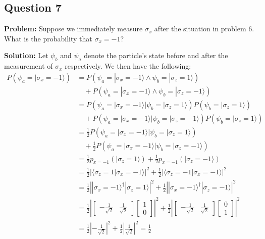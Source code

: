 \documentclass{article}
\begin{document}
\subsection*{Question 7}
\noindent\textbf{Problem:} Suppose we immediately measure $\sigma_x$ after the situation in problem 6. What is the probability that $\sigma_x=-1$?
\bigskip

\noindent\textbf{Solution:} Let $\psi_b$ and $\psi_a$ denote the particle's state before and after the measurement of $\sigma_x$ respectively. We then have the following:
\begin{align*}
    P(\psi_a=|\sigma_x=-1\rangle)&=P(\psi_a=|\sigma_x=-1\rangle\wedge\psi_b=|\sigma_z=1\rangle)\\&\quad+P(\psi_a=|\sigma_x=-1\rangle\wedge\psi_b=|\sigma_z=-1\rangle)\tag{law of total prob.}\\
    &=P(\psi_a=|\sigma_x=-1\rangle|\psi_b=|\sigma_z=1\rangle)P(\psi_b=|\sigma_z=1\rangle)\\
    &\quad+P(\psi_a=|\sigma_x=-1\rangle|\psi_b=|\sigma_z=-1\rangle)P(\psi_b=|\sigma_z=1\rangle)\tag{chain rule}\\
    &=\frac{1}{2}P(\psi_a=|\sigma_x=-1\rangle|\psi_b=|\sigma_z=1\rangle)\\
    &\quad+\frac{1}{2}P(\psi_a=|\sigma_x=-1\rangle|\psi_b=|\sigma_z=-1\rangle)\tag{problem 6}\\
    &=\frac{1}{2}p_{x=-1}(|\sigma_z=1\rangle)+\frac{1}{2}p_{x=-1}(|\sigma_z=-1\rangle)\\
    &=\frac{1}{2}\left|\langle\sigma_z=1|\sigma_x=-1\rangle\right|^2+\frac{1}{2}\left|\langle\sigma_z=-1|\sigma_x=-1\rangle\right|^2\\
    &=\frac{1}{2}\left||\sigma_x=-1\rangle^\dagger|\sigma_z=1\rangle\right|^2+\frac{1}{2}\left||\sigma_x=-1\rangle^\dagger|\sigma_z=-1\rangle\right|^2\\
    &=\frac{1}{2}\left|\begin{bmatrix}
        -\frac{1}{\sqrt{2}}&\frac{1}{\sqrt{2}}
    \end{bmatrix}\begin{bmatrix}
        1\\0
    \end{bmatrix}\right|^2+\frac{1}{2}\left|\begin{bmatrix}
        -\frac{1}{\sqrt{2}}&\frac{1}{\sqrt{2}}
    \end{bmatrix}\begin{bmatrix}
        0\\1
    \end{bmatrix}\right|^2\\
    &=\frac{1}{2}\left|-\frac{1}{\sqrt{2}}\right|^2+\frac{1}{2}\left|\frac{1}{\sqrt{2}}\right|^2=\frac{1}{2}
\end{align*}
\end{document}
